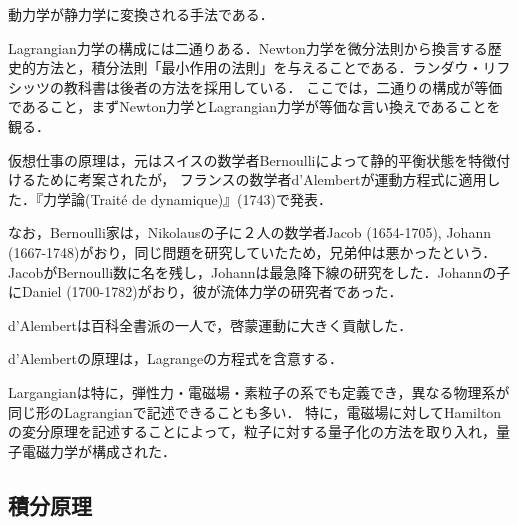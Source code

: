 \documentclass[uplatex, dvipdfmx]{jsreport}
\begin{document}
\begin{tcolorbox}[colframe=ForestGreen, colback=ForestGreen!10!white,breakable,colbacktitle=ForestGreen!40!white,coltitle=black,fonttitle=\bfseries\sffamily,
title=仮想仕事とd'Alembertの法則によるLagrangeの方程式の導出]
    動力学が静力学に変換される手法である．
\end{tcolorbox}

\begin{screen}
    Lagrangian力学の構成には二通りある．Newton力学を微分法則から換言する歴史的方法と，積分法則「最小作用の法則」を与えることである．ランダウ・リフシッツの教科書は後者の方法を採用している．
    ここでは，二通りの構成が等価であること，まずNewton力学とLagrangian力学が等価な言い換えであることを観る．
\end{screen}

\begin{axiom}

\end{axiom}
\begin{remark}
    仮想仕事の原理は，元はスイスの数学者Bernoulliによって静的平衡状態を特徴付けるために考案されたが，
    フランスの数学者d'Alembertが運動方程式に適用した．『力学論(Traité de dynamique)』(1743)で発表．

    なお，Bernoulli家は，Nikolausの子に２人の数学者Jacob (1654-1705), Johann (1667-1748)がおり，同じ問題を研究していたため，兄弟仲は悪かったという．
    JacobがBernoulli数に名を残し，Johannは最急降下線の研究をした．Johannの子にDaniel (1700-1782)がおり，彼が流体力学の研究者であった．

    d'Alembertは百科全書派の一人で，啓蒙運動に大きく貢献した．
\end{remark}

\begin{theorem}
    d'Alembertの原理は，Lagrangeの方程式を含意する．
\end{theorem}

\begin{remarks}
    Largangianは特に，弾性力・電磁場・素粒子の系でも定義でき，異なる物理系が同じ形のLagrangianで記述できることも多い．
    特に，電磁場に対してHamiltonの変分原理を記述することによって，粒子に対する量子化の方法を取り入れ，量子電磁力学が構成された．
\end{remarks}

\subsection{積分原理}
\end{document}

